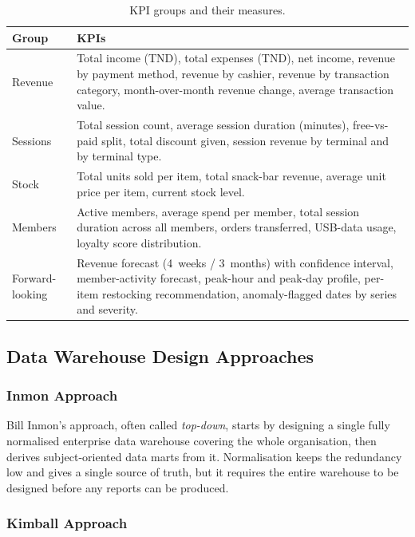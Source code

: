 \documentclass[12pt, a4paper]{report}
\begin{document}
\begin{table}[H]
  \centering
  \caption{KPI groups and their measures.\label{tab:kpis}}
  \begin{tabular}{p{3cm} p{10cm}}
    \toprule
    \textbf{Group} & \textbf{KPIs} \\
    \midrule
    Revenue
      & Total income (TND), total expenses (TND), net income, revenue by
        payment method, revenue by cashier, revenue by transaction category,
        month-over-month revenue change, average transaction value. \\[4pt]
    Sessions
      & Total session count, average session duration (minutes), free-vs-paid
        split, total discount given, session revenue by terminal and by
        terminal type. \\[4pt]
    Stock
      & Total units sold per item, total snack-bar revenue, average unit
        price per item, current stock level. \\[4pt]
    Members
      & Active members, average spend per member, total session duration
        across all members, orders transferred, USB-data usage, loyalty score
        distribution. \\[4pt]
    Forward-looking
      & Revenue forecast (4~weeks / 3~months) with confidence interval,
        member-activity forecast, peak-hour and peak-day profile, per-item
        restocking recommendation, anomaly-flagged dates by series and
        severity. \\
    \bottomrule
  \end{tabular}
\end{table}

\subsection{Data Warehouse Design Approaches}

\subsubsection{Inmon Approach}

Bill Inmon's approach, often called \textit{top-down}, starts by designing a
single fully normalised enterprise data warehouse covering the whole
organisation, then derives subject-oriented data marts from it. Normalisation
keeps the redundancy low and gives a single source of truth, but it requires
the entire warehouse to be designed before any reports can be produced.

\subsubsection{Kimball Approach}
\end{document}
